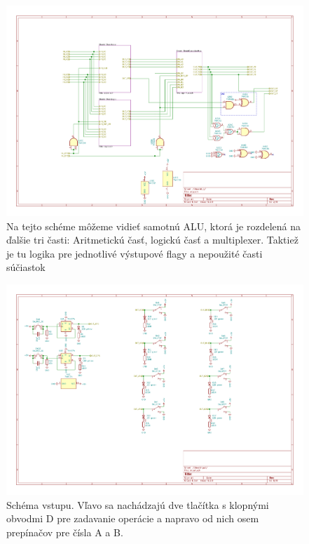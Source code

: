 \documentclass{article}
\begin{document}
    \begin{figure}[h!]
        \centering
        \includegraphics[width=.8\linewidth]{alu_sheet.pdf}
        \caption{Na tejto schéme môžeme vidieť samotnú ALU, ktorá je rozdelená na ďalšie tri časti: Aritmetickú časť, logickú časť a multiplexer. Taktiež je tu logika pre jednotlivé výstupové flagy a nepoužité časti súčiastok}
    \end{figure}

    \begin{figure}[h!]
        \centering
        \includegraphics[width=.8\linewidth]{input_sheet.pdf}
        \caption{Schéma vstupu. Vľavo sa nachádzajú dve tlačítka s klopnými obvodmi D pre zadavanie operácie a napravo od nich osem prepínačov pre čísla A a B.}
    \end{figure}
\end{document}
